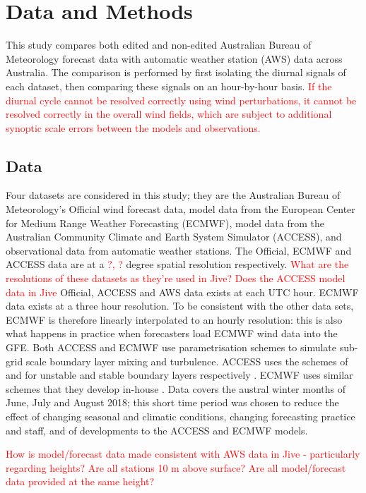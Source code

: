 \documentclass{ametsoc}
\begin{document}
\section{Data and Methods} \label{Sec:Methods}
This study compares both edited and non-edited Australian Bureau of Meteorology forecast data with automatic weather station (AWS) data across Australia. The comparison is performed by first isolating the diurnal signals of each dataset, then comparing these signals on an hour-by-hour basis. \textcolor{red}{If the diurnal cycle cannot be resolved correctly using wind perturbations, it cannot be resolved correctly in the overall wind fields, which are subject to additional synoptic scale errors between the models and observations.}

\subsection{Data} 
Four datasets are considered in this study; they are the Australian Bureau of Meteorology's Official wind forecast data, model data from the European Center for Medium Range Weather Forecasting (ECMWF), model data from the Australian Community Climate and Earth System Simulator (ACCESS), and observational data from automatic weather stations. The Official, ECMWF and ACCESS data are at a \textcolor{red}{?, ?} degree spatial resolution respectively. \textcolor{red}{What are the resolutions of these datasets as they're used in Jive? Does the ACCESS model data in Jive} Official, ACCESS and AWS data exists at each UTC hour. ECMWF data exists at a three hour resolution. To be consistent with the other data sets, ECMWF is therefore linearly interpolated to an hourly resolution: this is also what happens in practice when forecasters load ECMWF wind data into the GFE. Both ACCESS and ECMWF use parametrisation schemes to simulate sub-grid scale boundary layer mixing and turbulence. ACCESS uses the schemes of \citet{lock00} and \citet{louis79} for unstable and stable boundary layers respectively \citep{bom10}. ECMWF uses similar schemes that they develop in-house \citep{ecmwf18}. Data covers the austral winter months of June, July and August 2018; this short time period was chosen to reduce the effect of changing seasonal and climatic conditions, changing forecasting practice and staff, and of developments to the ACCESS and ECMWF models.  

 \textcolor{red}{How is model/forecast data made consistent with AWS data in Jive - particularly regarding heights? Are all stations 10 m above surface? Are all model/forecast data provided at the same height?} 
\end{document}
